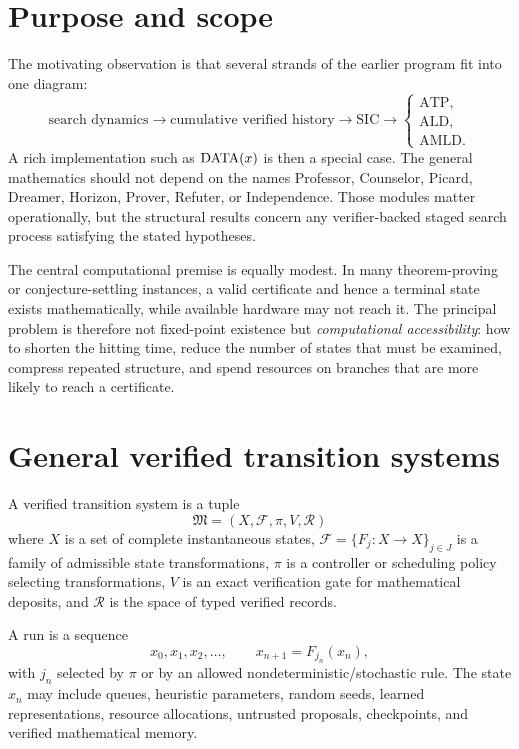 \section{Purpose and scope}
The motivating observation is that several strands of the earlier program fit into one diagram:
\[
\text{search dynamics}
\longrightarrow
\text{cumulative verified history}
\longrightarrow
\text{SIC}
\longrightarrow
\begin{cases}
\text{ATP},\\
\text{ALD},\\
\text{AMLD}.
\end{cases}
\]
A rich implementation such as $\operatorname{DATA}(x)$ is then a special case. The general mathematics should not depend on the names Professor, Counselor, Picard, Dreamer, Horizon, Prover, Refuter, or Independence. Those modules matter operationally, but the structural results concern any verifier-backed staged search process satisfying the stated hypotheses.

The central computational premise is equally modest. In many theorem-proving or conjecture-settling instances, a valid certificate and hence a terminal state exists mathematically, while available hardware may not reach it. The principal problem is therefore not fixed-point existence but \emph{computational accessibility}: how to shorten the hitting time, reduce the number of states that must be examined, compress repeated structure, and spend resources on branches that are more likely to reach a certificate.

\section{General verified transition systems}
\begin{definition}
A verified transition system is a tuple
\[
\mathfrak M=(X,\mathcal F,\pi,V,\mathcal R)
\]
where $X$ is a set of complete instantaneous states, $\mathcal F=\{F_j:X\to X\}_{j\in J}$ is a family of admissible state transformations, $\pi$ is a controller or scheduling policy selecting transformations, $V$ is an exact verification gate for mathematical deposits, and $\mathcal R$ is the space of typed verified records.
\end{definition}

A run is a sequence
\[
x_0,x_1,x_2,\ldots,\qquad x_{n+1}=F_{j_n}(x_n),
\]
with $j_n$ selected by $\pi$ or by an allowed nondeterministic/stochastic rule. The state $x_n$ may include queues, heuristic parameters, random seeds, learned representations, resource allocations, untrusted proposals, checkpoints, and verified mathematical memory.

